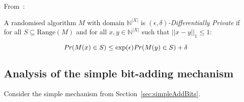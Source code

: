 \documentclass[10pt,a4paper]{article}
\begin{document}
From~\cite{dwork2014algorithmic}:

\begin{defn} 
A randomised algorithm $M$ with domain $\mathbb{N}^|X|$ is \emph{$(\epsilon,\delta)$-Differentially Private} 
if for all $S \subseteq \text{Range}(M)$ and for all $x,y \in \mathbb{N}^|X|$ such that $|| x-y||_1 \leq 1:$

$$ \mathit{Pr} (M(x) \in S) \leq \exp(\epsilon) \mathit{Pr}(M(y) \in S)+ \delta$$
\end{defn}

\subsection{Analysis of the simple bit-adding mechanism}
Consider the simple mechanism from Section~\ref{sec:simpleAddBits}.
\end{document}
